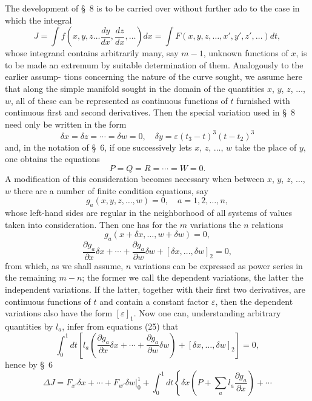\documentclass[11pt,a4paper,leqno]{article}
\begin{document}
The development of \S~8 is to be carried over without further ado to the case in which the integral
\[
J=\int f\left(x,y,z\ldots \frac{dy}{dx},\frac{dz}{dx},\ldots\right)dx=\int F(x,y,z,\ldots,x',y',z',\ldots)dt,
\]
whose integrand contains arbitrarily many, say $m-1$, unknown functions of $x$, is to be made an extremum by suitable determination of them. Analogously to the earlier assump-
tions concerning the nature of the curve sought, we assume here that along the simple manifold sought in the domain of the quantities $x$, $y$, $z$, $\ldots$, $w$, all of these can be represented as continuous functions of $t$ furnished with continuous first and second derivatives. Then the special variation used in \S~8 need only be written in the form
\[
\delta x=\delta z=\cdots=\delta w=0,\quad \delta y=\varepsilon(t_3-t)^3(t-t_2)^3
\]
and, in the notation of \S~6, if one successively lets $x$, $z$, $\ldots$, $w$ take the place of $y$, one obtains the equations
\[
P=Q=R=\cdots=W=0.
\]
A modification of this consideration becomes necessary when between $x$, $y$, $z$, $\ldots$, $w$ there are a number of finite condition equations, say
\begin{equation}\tag{24}
g_a(x,y,z,\ldots,w)=0,\quad a=1,2,\ldots,n,
\end{equation}
whose left-hand sides are regular in the neighborhood of all systems of values taken into consideration. Then one has for the $m$ variations the $n$ relations
\[
g_a(x+\delta x,\ldots,w+\delta w)=0,
\]
\begin{equation}\tag{25}
\frac{\partial g_a}{\partial x}\delta x+\cdots+\frac{\partial g_a}{\partial w}\delta w+[\delta x,\ldots,\delta w]_2=0,
\end{equation}
from which, as we shall assume, $n$ variations can be expressed as power series in the remaining $m-n$; the former we call the dependent variations, the latter the independent variations. If the latter, together with their first two derivatives, are continuous functions of $t$ and contain a constant factor $\varepsilon$, then the dependent variations also have the form $[\varepsilon]_1$. Now one can, understanding arbitrary quantities by $l_a$, infer from equations (25) that
\[
\int_0^1 dt\left[l_a\left(\frac{\partial g_a}{\partial x}\delta x+\cdots+\frac{\partial g_a}{\partial w}\delta w\right)+[\delta x,\ldots,\delta w]_2\right]=0,
\]
hence by \S~6
\[
\Delta J=\left. F_{x'}\delta x+\cdots+F_{w'}\delta w\right|_0^1+\int_0^1dt\left\{\delta x\left(P+\sum_a l_a\frac{\partial g_a}{\partial x}\right)+\cdots
\right.
\]
\end{document}
